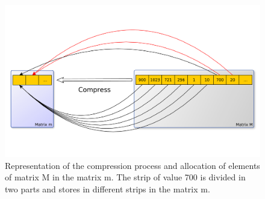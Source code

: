 \documentclass[10pt]{article}
\begin{document}
\begin{figure}[h]
  \includegraphics[scale=0.3,clip]{fig01}
  \caption{Representation of the compression process and allocation of 
elements of matrix M in the matrix m. The strip of value 700 is divided in two 
parts and stores in different strips in the matrix m.}
  \label{fig:01}
\end{figure}
\end{document}
